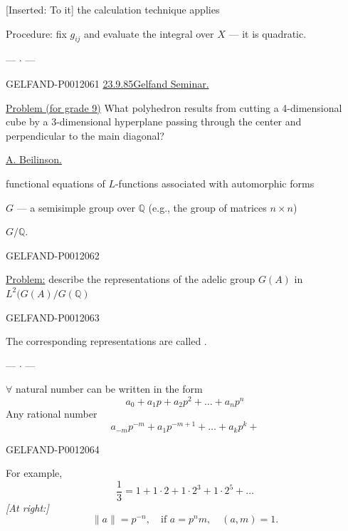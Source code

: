 [Inserted: To it] the calculation technique applies

Procedure: fix \(g_{ij}\) and evaluate the integral over \(X\) --- it is quadratic.
\begin{center}--- \(\cdot\) ---\end{center}


\begin{GelfandAdjacentEvidence}{GELFAND-P001206}{1}
\underline{23.9.85}\quad\underline{Gelfand Seminar.}

 \underline{Problem (for grade 9)}
What polyhedron results from cutting a 4-dimensional cube by a 3-dimensional hyperplane passing through the center and perpendicular to the main diagonal?

\underline{A. Beilinson.} 

functional equations of $L$-functions associated with automorphic forms

\(G\) --- a semisimple group over \(\mathbb Q\) (e.g., the group of matrices \(n\times n\))

\(G/\mathbb Q\).
\end{GelfandAdjacentEvidence}
\begin{GelfandAdjacentEvidence}{GELFAND-P001206}{2}


\underline{Problem:} describe the representations of the adelic group \(G(A)\) in \(L^2(G(A)/G(\mathbb Q)\)
\end{GelfandAdjacentEvidence}
\begin{GelfandAdjacentEvidence}{GELFAND-P001206}{3}


The corresponding representations are called .
\begin{center}--- \(\cdot\) ---\end{center}
 \(\forall\) natural number can be written in the form
\[
a_0+a_1p+a_2p^2+\ldots+a_np^n
\]
Any rational number
\[
a_{-m}p^{-m}+a_1p^{-m+1}+\ldots+a_kp^k+
\]
\end{GelfandAdjacentEvidence}
\begin{GelfandAdjacentEvidence}{GELFAND-P001206}{4}


For example,
\[
\frac13=1+1\cdot2+1\cdot2^3+1\cdot2^5+\ldots
\]
\textit{[At right:]}
\[
\|a\|=p^{-n},\quad\text{if }a=p^nm,\quad(a,m)=1.
\]
\end{GelfandAdjacentEvidence}

